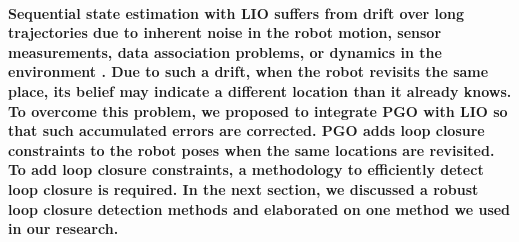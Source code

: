 \paragraph{\textnormal{Sequential state estimation with LIO suffers from drift over long trajectories due to inherent noise in the robot motion, sensor measurements, data association problems, or dynamics in the environment \cite{gupta2024icra}. Due to such a drift, when the robot revisits the same place, its belief may indicate a different location than it already knows. To overcome this problem, we proposed to integrate PGO with LIO so that such accumulated errors are corrected. PGO adds loop closure constraints to the robot poses when the same locations are revisited. To add loop closure constraints, a methodology to efficiently detect loop closure is required. In the next section, we discussed a robust loop closure detection methods and elaborated on one method we used in our research.}}
